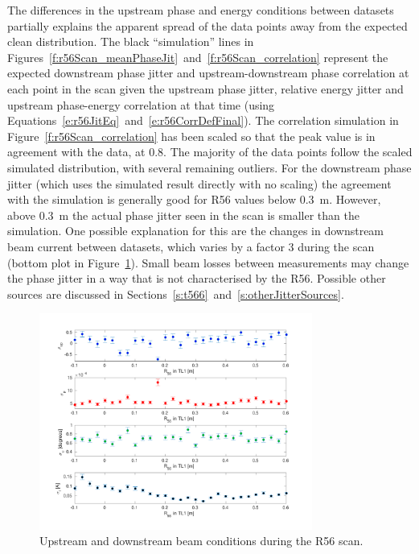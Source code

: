 The differences in the upstream phase and energy conditions between datasets partially explains the apparent spread of the data points away from the expected clean distribution. The black ``simulation'' lines in Figures~\ref{f:r56Scan_meanPhaseJit}~and~\ref{f:r56Scan_correlation} represent the expected downstream phase jitter and upstream-downstream phase correlation at each point in the scan given the upstream phase jitter, relative energy jitter and upstream phase-energy correlation at that time (using Equations~\ref{e:r56JitEq}~and~\ref{e:r56CorrDefFinal}). The correlation simulation in Figure~\ref{f:r56Scan_correlation} has been scaled so that the peak value is in agreement with the data, at 0.8. The majority of the data points follow the scaled simulated distribution, with several remaining outliers. For the downstream phase jitter (which uses the simulated result directly with no scaling) the agreement with the simulation is generally good for R56 values below 0.3~m. However, above 0.3~m the actual phase jitter seen in the scan is smaller than the simulation. One possible explanation for this are the changes in downstream beam current between datasets, which varies by a factor 3 during the scan (bottom plot in Figure~\ref{f:r56Scan_upstreamParams}). Small beam losses between measurements may change the phase jitter in a way that is not characterised by the R56. Possible other sources are discussed in Sections~\ref{s:t566}~and~\ref{s:otherJitterSources}.

\begin{figure}
  \centering
  \includegraphics[width=0.8\textwidth]{Figures/propagation/r56Scan_upstreamParams}
  \caption{Upstream and downstream beam conditions during the R56 scan.}
  \label{f:r56Scan_upstreamParams}
\end{figure}

